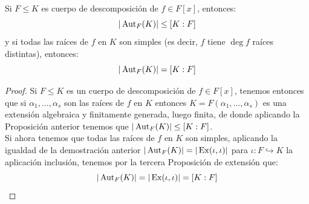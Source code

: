 \begin{prop}\label{prop:cuerpo_desc_aut_f_lin}
    Si $F\leq K$ es cuerpo de descomposición de $f\in F[x]$, entonces: 
    \begin{equation*}
        |\operatorname{Aut}_F(K)| \leq [K:F]
    \end{equation*}
    y si todas las raíces de $f$ en $K$ son simples (es decir, $f$ tiene $\deg f$ raíces distintas), entonces:
    \begin{equation*}
        |\operatorname{Aut}_F(K)| = [K:F]
    \end{equation*}
    \begin{proof}
        Si $F\leq K$ es un cuerpo de descomposición de $f\in F[x]$, tenemos entonces que si $\alpha_1, \ldots, \alpha_s$ son las raíces de $f$ en $K$ entonces $K = F(\alpha_1, \ldots, \alpha_s)$ es una extensión algebraica y finitamente generada, luego finita, de donde aplicando la Proposición anterior tenemos que $|\operatorname{Aut}_F(K)|\leq [K:F]$.\\

        \noindent
        Si ahora tenemos que todas las raíces de $f$ en $K$ son simples, aplicando la igualdad de la demostración anterior $|\operatorname{Aut}_F(K)| = |\operatorname{Ex}(\iota,\iota)|$ para $\iota:F\hookrightarrow K$ la aplicación inclusión, tenemos por la tercera Proposición de extensión que:
        \begin{equation*}
            |\operatorname{Aut}_F(K)| = |\operatorname{Ex}(\iota,\iota)| = [K:F]
        \end{equation*}
    \end{proof}
\end{prop}

